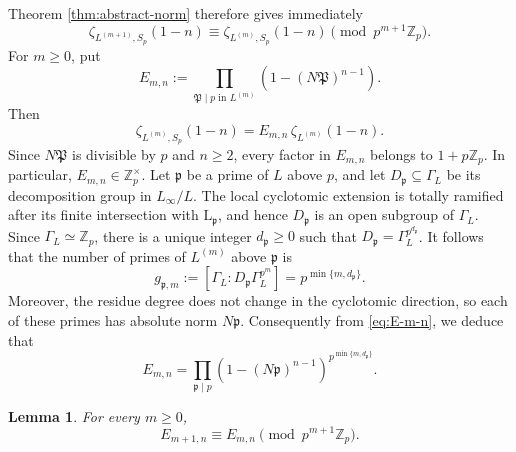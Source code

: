 \documentclass[11pt,table]{amsart}
\newtheorem{lemma}[theorem]{Lemma}
\numberwithin{equation}{section}
\begin{document}
Theorem \ref{thm:abstract-norm} therefore gives immediately
\begin{equation}
\label{eq:p-depleted-zeta-congruence}
        \zeta_{L^{(m+1)},S_p}(1-n)
        \equiv
        \zeta_{L^{(m)},S_p}(1-n)
        \pmod{p^{m+1}\mathbb Z_p}.
\end{equation}
For \(m\geq0\), put
\begin{equation}
\label{eq:E-m-n}
        E_{m,n}
        :=
        \prod_{\mathfrak P\mid p\text{ in }L^{(m)}}
        \left(
        1-(N\mathfrak P)^{n-1}
        \right).
\end{equation}
Then
\begin{equation}
\label{eq:p-depletion-full-zeta}
        \zeta_{L^{(m)},S_p}(1-n)
        =
        E_{m,n}\,
        \zeta_{L^{(m)}}(1-n).
\end{equation}
Since \(N\mathfrak P\) is divisible by \(p\) and \(n\geq2\), every factor
in \(E_{m,n}\) belongs to \(1+p\mathbb Z_p\).  In particular, $E_{m,n}\in\mathbb Z_p^\times$. Let \(\mathfrak p\) be a prime of \(L\) above \(p\), and let $D_{\mathfrak p}\subseteq\Gamma_L$ be its decomposition group in \(L_\infty/L\).  The local cyclotomic
extension is totally ramified after its finite intersection with
\(\mathrm{L}_{\mathfrak p}\), and hence \(D_{\mathfrak p}\) is an open subgroup
of \(\Gamma_L\).  Since \(\Gamma_L\simeq\mathbb Z_p\), there is a unique
integer \(d_{\mathfrak p}\geq0\) such that $D_{\mathfrak p}
        =
        \Gamma_L^{p^{d_{\mathfrak p}}}$. It follows that the number of primes of \(L^{(m)}\) above
\(\mathfrak p\) is
\[
        g_{\mathfrak p,m}:=
        [\Gamma_L:
        D_{\mathfrak p}\Gamma_L^{p^m}]=
        p^{\min\{m,d_{\mathfrak p}\}}.
\]
Moreover, the residue degree does not change in the cyclotomic direction,
so each of these primes has absolute norm $N\mathfrak p$.
Consequently from \eqref{eq:E-m-n}, we deduce that
\begin{equation}
\label{eq:Euler-product-relative}
        E_{m,n}
        =
        \prod_{\mathfrak p\mid p}
        \left(
        1-(N\mathfrak p)^{n-1}
        \right)^{
        p^{\min\{m,d_{\mathfrak p}\}}
        }.
\end{equation}

\begin{lemma}
\label{lem:Euler-factor-growing-congruence}
For every \(m\geq0\),
\[
        E_{m+1,n}
        \equiv
        E_{m,n}
        \pmod{p^{m+1}\mathbb Z_p}.
\]
\end{lemma}
\end{document}
